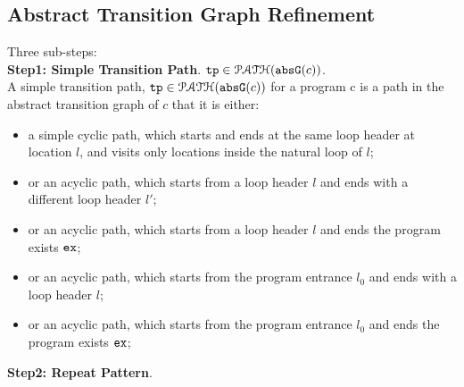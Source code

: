 \subsection{Abstract Transition Graph Refinement}
\label{sec:refine}
Three sub-steps:
\\
\textbf{Step1: Simple Transition Path}. $\mathtt{tp} \in \mathcal{PATH}(\mathtt{abs}{\mathtt{G}}(c))$.
\\
A simple transition path, $\mathtt{tp} \in \mathcal{PATH}(\mathtt{abs}{\mathtt{G}}(c))$ for a program c is a path in the abstract transition graph of $c$ that it is either:
\begin{itemize}
  \item a simple cyclic path, which starts and ends at the same loop header at location $l$, 
  and visits only locations inside the natural loop of $l$;
  \item or an acyclic path, which starts from a loop header $l$ 
and ends with a different loop header $l'$;
\item or an acyclic path, which starts from a loop header $l$ 
and ends the program exists $\mathtt{ex}$;
\item or an acyclic path, which starts from the program entrance $l_0$
and ends with a loop header $l$;
\item or an acyclic path, which starts from the program entrance $l_0$
and ends the program exists $\mathtt{ex}$;
\end{itemize}
%
\textbf{Step2: Repeat Pattern}.
